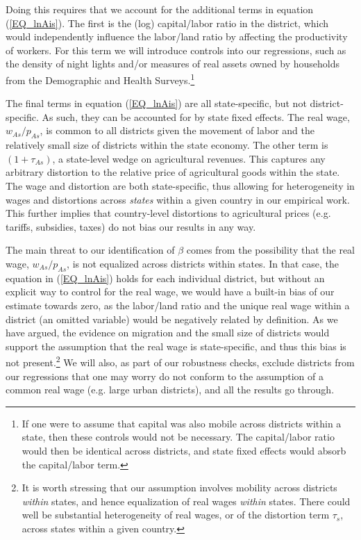 \documentclass[11pt]{article}
\begin{document}
Doing this requires that we account for the additional terms in equation (\ref{EQ_lnAis}). The first is the (log) capital/labor ratio in the district, which would independently influence the labor/land ratio by affecting the productivity of workers. For this term we will introduce controls into our regressions, such as the density of night lights and/or measures of real assets owned by households from the Demographic and Health Surveys.\footnote{If one were to assume that capital was also mobile across districts within a state, then these controls would not be necessary. The capital/labor ratio would then be identical across districts, and state fixed effects would absorb the capital/labor term.}

The final terms in equation (\ref{EQ_lnAis}) are all state-specific, but not district-specific. As such, they can be accounted for by state fixed effects. The real wage, $w_{As}/p_{As}$, is common to all districts given the movement of labor and the relatively small size of districts within the state economy. The other term is $(1+\tau_{As})$, a state-level wedge on agricultural revenues. This captures any arbitrary distortion to the relative price of agricultural goods within the state. The wage and distortion are both state-specific, thus allowing for heterogeneity in wages and distortions across \textit{states} within a given country in our empirical work. This further implies that country-level distortions to agricultural prices (e.g. tariffs, subsidies, taxes) do not bias our results in any way.

The main threat to our identification of $\beta$ comes from the possibility that the real wage, $w_{As}/p_{As}$, is not equalized across districts within states. In that case, the equation in (\ref{EQ_lnAis}) holds for each individual district, but without an explicit way to control for the real wage, we would have a built-in bias of our estimate towards zero, as the labor/land ratio and the unique real wage within a district (an omitted variable) would be negatively related by definition. As we have argued, the evidence on migration and the small size of districts would support the assumption that the real wage is state-specific, and thus this bias is not present.\footnote{It is worth stressing that our assumption involves mobility across districts \textit{within} states, and hence equalization of real wages \textit{within} states. There could well be substantial heterogeneity of real wages, or of the distortion term $\tau_s$, across states within a given country.} We will also, as part of our robustness checks, exclude districts from our regressions that one may worry do not conform to the assumption of a common real wage (e.g. large urban districts), and all the results go through.
\end{document}
